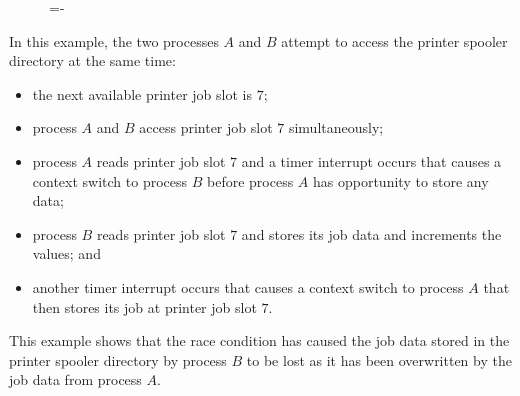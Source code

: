 \documentclass[a4paper]{systems-software}
\begin{document}
\begin{figure}[H]
  \lineskip=-\fboxrule
\end{figure}

In this example, the two processes $A$ and $B$ attempt to access the printer spooler directory at the same time:
\begin{itemize}
	\item the next available printer job slot is $7$;
	\item process $A$ and $B$ access printer job slot $7$ simultaneously;
	\item process $A$ reads printer job slot $7$ and a timer interrupt occurs that causes a context switch to process $B$ before process $A$ has opportunity to store any data;
	\item process $B$ reads printer job slot $7$ and stores its job data and increments the values; and
	\item another timer interrupt occurs that causes a context switch to process $A$ that then stores its job at printer job slot $7$.
\end{itemize}

This example shows that the race condition has caused the job data stored in the printer spooler directory by process $B$ to be lost as it has been overwritten by the job data from process $A$.
\end{document}
